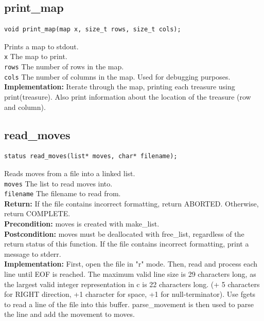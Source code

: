 \documentclass{article}
\begin{document}
\subsection{print\_map}
\begin{lstlisting}
void print_map(map x, size_t rows, size_t cols);
\end{lstlisting}


  Prints a map to stdout.\\ 
 \texttt{x} The map to print.\\ 
 \texttt{rows} The number of rows in the map.\\ 
 \texttt{cols} The number of columns in the map.
  Used for debugging purposes.\\ 
 
 
 \textbf{Implementation:}
Iterate through the map, printing each treasure using  print(treasure).
Also print information about the location of the treasure (row and column).
 

\subsection{read\_moves}
\begin{lstlisting}
status read_moves(list* moves, char* filename);
\end{lstlisting}


  Reads moves from a file into a linked list.\\ 
 \texttt{moves} The list to read moves into.\\ 
 \texttt{filename} The filename to read from.\\ 
 \textbf{Return:} If the file contains incorrect formatting, return ABORTED.
     Otherwise, return COMPLETE.\\ 
 \textbf{Precondition:}  moves is created with  make\_list.\\ 
 \textbf{Postcondition:}  moves must be deallocated with  free\_list, regardless
     of the return status of this function.
  If the file contains incorrect formatting, print a message
     to stderr.\\ 
 
 
 \textbf{Implementation:}
First, open the file in "r" mode. Then, read and process each line until EOF is reached.
The maximum valid line size is 29 characters long, as the largest valid integer representation
in c is 22 characters long.
(+ 5 characters for RIGHT direction, +1 character for space, +1 for null-terminator).
Use  fgets to read a line of the file into this buffer.  parse\_movement is then
 used to parse the line and add the movement to  moves.
 
\end{document}
